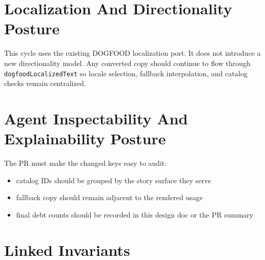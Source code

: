 \section{Localization And Directionality Posture}\label{record-197-localization-and-directionality-posture}

This cycle uses the existing DOGFOOD localization port. It does not introduce a new directionality model. Any converted copy should continue to flow through \texttt{d\allowbreak{}o\allowbreak{}g\allowbreak{}f\allowbreak{}o\allowbreak{}o\allowbreak{}d\allowbreak{}L\allowbreak{}o\allowbreak{}c\allowbreak{}a\allowbreak{}l\allowbreak{}i\allowbreak{}z\allowbreak{}e\allowbreak{}d\allowbreak{}T\allowbreak{}e\allowbreak{}x\allowbreak{}t} so locale selection, fallback interpolation, and catalog checks remain centralized.

\section{Agent Inspectability And Explainability Posture}\label{record-197-agent-inspectability-and-explainability-posture}

The PR must make the changed keys easy to audit:

\begin{itemize}
\tightlist
\item
  catalog IDs should be grouped by the story surface they serve
\item
  fallback copy should remain adjacent to the rendered usage
\item
  final debt counts should be recorded in this design doc or the PR summary
\end{itemize}

\section{Linked Invariants}\label{record-197-linked-invariants}

